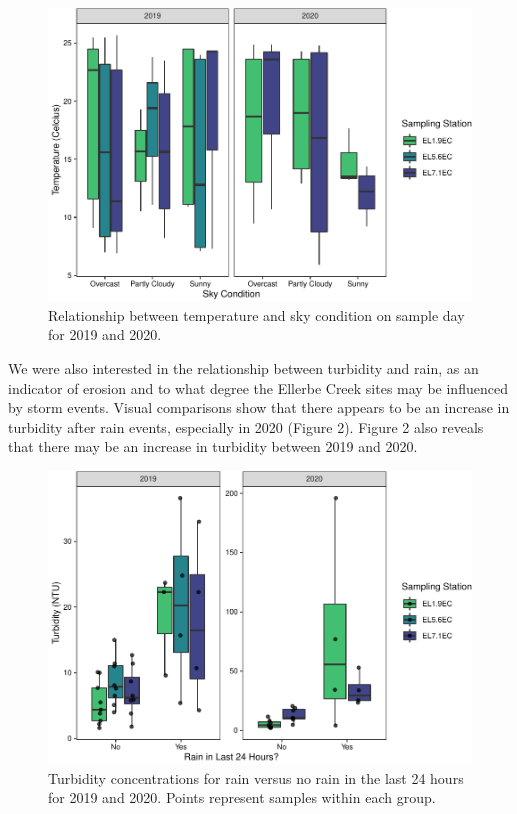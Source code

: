 \documentclass[
  12pt,
]{article}
\begin{document}
\begin{figure}
\centering
\includegraphics{August_Lindborg_ENV872_Project_files/figure-latex/unnamed-chunk-3-1.pdf}
\caption{Relationship between temperature and sky condition on sample
day for 2019 and 2020.}
\end{figure}

\newpage

We were also interested in the relationship between turbidity and rain,
as an indicator of erosion and to what degree the Ellerbe Creek sites
may be influenced by storm events. Visual comparisons show that there
appears to be an increase in turbidity after rain events, especially in
2020 (Figure 2). Figure 2 also reveals that there may be an increase in
turbidity between 2019 and 2020.

\begin{figure}
\centering
\includegraphics{August_Lindborg_ENV872_Project_files/figure-latex/unnamed-chunk-4-1.pdf}
\caption{Turbidity concentrations for rain versus no rain in the last 24
hours for 2019 and 2020. Points represent samples within each group.}
\end{figure}
\end{document}
